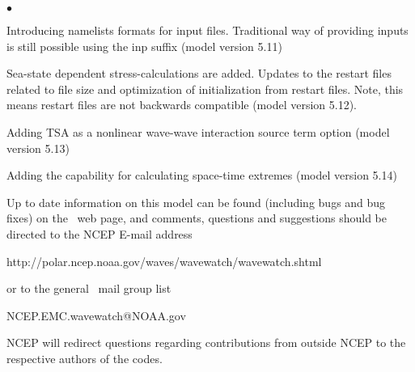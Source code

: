 \begin{list}{$\bullet$}{\rightmargin 5mm \parsep 0mm \itemsep 0mm}
\item Introducing namelists formats for input files. Traditional way of providing inputs is still possible using the inp suffix (model version 5.11)

\item Sea-state dependent stress-calculations are added.  Updates to the restart files related to file size and optimization of initialization from restart files. Note, this means restart files are not backwards compatible  (model version 5.12).

\item Adding TSA as a nonlinear wave-wave interaction source term option (model version 5.13) 

\item Adding the capability for calculating space-time extremes (model version 5.14)

\end{list}

\vspace{\baselineskip} \noindent 
Up to date information on this model can be found (including bugs and bug
fixes) on the \ws\ web page, and comments, questions and suggestions should be
directed to the NCEP E-mail address

\begin{center}
http://polar.ncep.noaa.gov/waves/wavewatch/wavewatch.shtml
\end{center}

\noindent
or to the general \ws\ mail group list

\begin{center}
NCEP.EMC.wavewatch@NOAA.gov
\end{center}

\noindent
NCEP will redirect questions regarding contributions from outside NCEP to the
respective authors of the codes.
